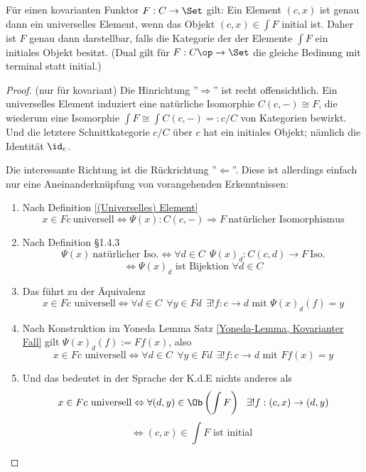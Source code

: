 \documentclass[11pt]{article}
\begin{document}
\begin{theorem} 
Für einen kovarianten Funktor $F: C\to \Set$ gilt: Ein Element $(c,x)$ ist genau dann ein universelles Element, wenn das Objekt $(c,x)\in \int F$ initial ist. Daher ist $F$ genau dann darstellbar, falls die Kategorie der der Elemente $\int F$ ein initiales Objekt besitzt. (Dual gilt für $F:C\op \to \Set$ die gleiche Bedinung mit terminal statt initial.)
\end{theorem}

\begin{proof}(nur für kovariant) Die Hinrichtung ''$\Longrightarrow$'' ist recht offensichtlich. Ein universelles Element induziert eine natürliche Isomorphie $C(c,-)\cong F$, die wiederum eine Isomorphie $\int F \cong \int C(c,-)=: c/C$ von Kategorien bewirkt. Und die letztere Schnittkategorie $c/C$ über $c$ hat ein initiales Objekt; nämlich die Identität $\id_c$. \bigskip

Die interessante Richtung ist die Rückrichtung ''$\Longleftarrow$''. Diese ist allerdings einfach nur eine Aneinanderknüpfung von vorangehenden Erkenntnissen:

\begin{enumerate}
    \item Nach Definition \ref{(Universelles) Element} 
        $$x\in Fc \ \text{universell} \Leftrightarrow \Psi(x): C(c,-) \Rightarrow F \ \text{natürlicher Isomorphismus}$$
    \item Nach Definition §1.4.3
    $$\Psi(x) \ \text{natürlicher Iso.} \Leftrightarrow \forall d\in C\ \  \Psi(x)_d: C(c,d) \to F \ \text{Iso.}$$
    $$\Longleftrightarrow \Psi(x)_d \text{ ist Bijektion } \forall d\in C$$
    \item Das führt zu der Äquivalenz
    $$x\in Fc \text{ universell} \Leftrightarrow \forall d\in C\ \ \forall y\in Fd \ \ \exists !f:c\to d \text{ mit } \Psi(x)_d(f) = y$$
    \item Nach Konstruktion im Yoneda Lemma Satz \ref{Yoneda-Lemma, Kovarianter Fall} gilt $\Psi(x)_d(f) := Ff(x)$, also
    $$x\in Fc \text{ universell} \Leftrightarrow \forall d\in C\ \ \forall y\in Fd \ \ \exists !f:c\to d \text{ mit } Ff(x)=y$$
    \item Und das bedeutet in der Sprache der K.d.E nichts anderes als
    $$x\in Fc \text{ universell} \Leftrightarrow \forall (d,y)\in \Ob\left(\int F\right) \ \ \exists !f:(c,x) \to (d,y)$$
    $$\Longleftrightarrow (c,x)\in \int F \text{ ist initial }$$
\end{enumerate}
\end{proof}
\end{document}
